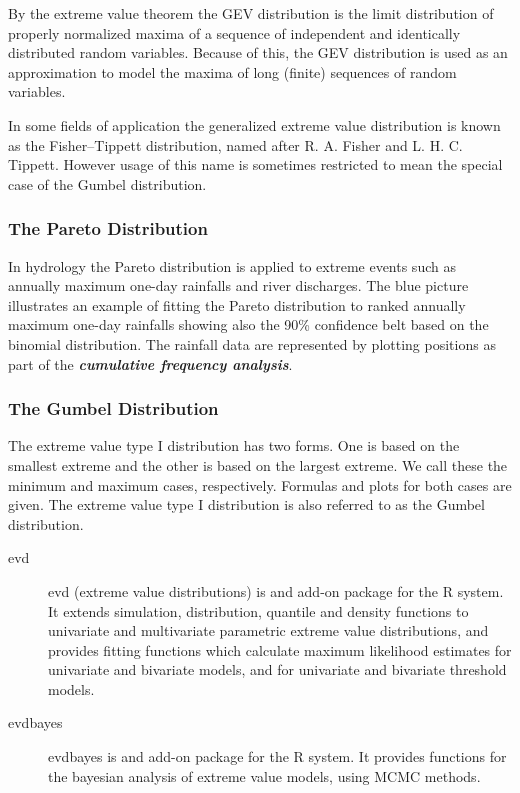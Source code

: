 \documentclass[MAIN.tex]{subfiles}
\begin{document}
\begin{frame}
By the extreme value theorem the GEV distribution is the limit distribution of properly normalized maxima of a sequence of independent and identically distributed random variables. Because of this, the GEV distribution is used as an approximation to model the maxima of long (finite) sequences of random variables.

In some fields of application the generalized extreme value distribution is known as the Fisher–Tippett distribution, named after R. A. Fisher and L. H. C. Tippett. However usage of this name is sometimes restricted to mean the special case of the Gumbel distribution.
\end{frame}
\begin{frame}
\frametitle{The Pareto Distribution}

In hydrology the Pareto distribution is applied to extreme events such as annually maximum one-day rainfalls and river discharges. The blue picture illustrates an example of fitting the Pareto distribution to ranked annually maximum one-day rainfalls showing also the 90\% confidence belt based on the binomial distribution. The rainfall data are represented by plotting positions as part of the  \textbf{\emph{cumulative frequency analysis}}.
\end{frame}
\begin{frame}
\frametitle{The Gumbel Distribution}
The extreme value type I distribution has two forms. One is based
on the smallest extreme and the other is based on the largest
extreme. We call these the minimum and maximum cases,
respectively. Formulas and plots for both cases are given. The
extreme value type I distribution is also referred to as the
Gumbel distribution.

\end{frame}
\begin{frame}	
\begin{description}
\item[evd]
	
	evd (extreme value distributions) is and add-on package for the R system. It extends simulation, distribution, quantile and density functions to univariate and multivariate parametric extreme value distributions, and provides fitting functions which calculate maximum likelihood estimates for univariate and bivariate models, and for univariate and bivariate threshold models.
	
\item[evdbayes]
	
	evdbayes is and add-on package for the R system. It provides functions for the bayesian analysis of extreme value models, using MCMC methods.
\end{description}
\end{frame}
\end{document}
